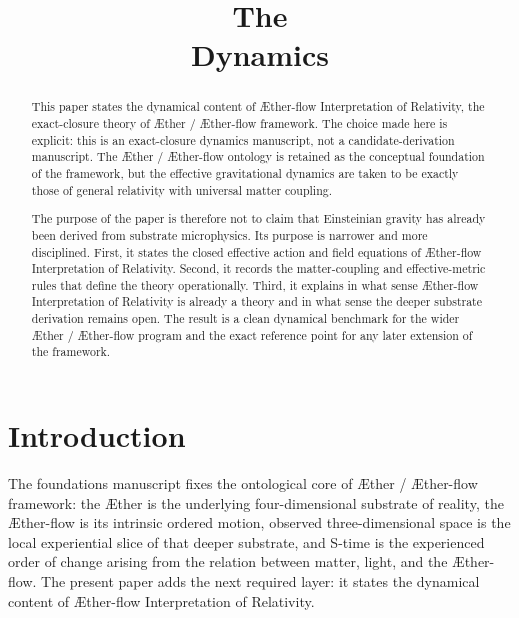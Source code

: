 \documentclass[11pt]{article}
\title{\textbf{The \TheoryName{}}\\[0.4em]
\large Dynamics}
\author{}
\date{}
\newcommand{\Aether}{\AE{}ther}
\newcommand{\Aflow}{\AE{}ther-flow}
\newcommand{\TheoryName}{\Aflow{} Interpretation of Relativity}
\newcommand{\TheoryProgram}{\Aether{} / \Aflow{} framework}
\begin{document}
\maketitle

\begin{abstract}
This paper states the dynamical content of \TheoryName{}, the exact-closure theory of \TheoryProgram{}. The choice made here is explicit: this is an exact-closure dynamics manuscript, not a candidate-derivation manuscript. The \Aether{} / \Aflow{} ontology is retained as the conceptual foundation of the framework, but the effective gravitational dynamics are taken to be exactly those of general relativity with universal matter coupling.

The purpose of the paper is therefore not to claim that Einsteinian gravity has already been derived from substrate microphysics. Its purpose is narrower and more disciplined. First, it states the closed effective action and field equations of \TheoryName{}. Second, it records the matter-coupling and effective-metric rules that define the theory operationally. Third, it explains in what sense \TheoryName{} is already a theory and in what sense the deeper substrate derivation remains open. The result is a clean dynamical benchmark for the wider \Aether{} / \Aflow{} program and the exact reference point for any later extension of the framework.
\end{abstract}

\section{Introduction}

The foundations manuscript fixes the ontological core of \TheoryProgram{}: the \Aether{} is the underlying four-dimensional substrate of reality, the \Aflow{} is its intrinsic ordered motion, observed three-dimensional space is the local experiential slice of that deeper substrate, and S-time is the experienced order of change arising from the relation between matter, light, and the \Aflow{}. The present paper adds the next required layer: it states the dynamical content of \TheoryName{}.
\end{document}
